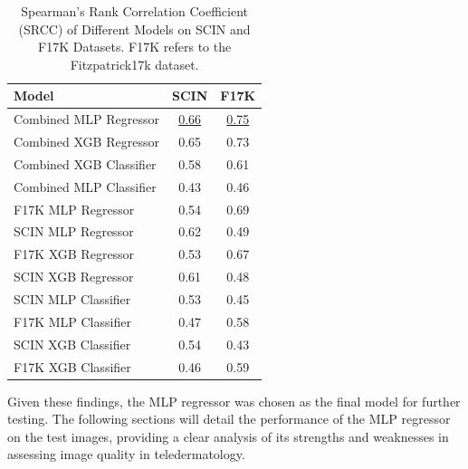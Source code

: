 \begin{table}[h]
    \centering
    \begin{tabular}{|l|c|c|}
        \hline
        \textbf{Model} & \textbf{SCIN} & \textbf{F17K} \\
        \hline
        Combined MLP Regressor & \underline{0.66} & \underline{0.75} \\
        Combined XGB Regressor & 0.65 & 0.73 \\
        Combined XGB Classifier & 0.58 & 0.61 \\
        Combined MLP Classifier & 0.43 & 0.46 \\
        \hline
        F17K MLP Regressor & 0.54 & 0.69 \\
        SCIN MLP Regressor & 0.62 & 0.49 \\
        F17K XGB Regressor & 0.53 & 0.67 \\
        SCIN XGB Regressor & 0.61 & 0.48 \\
        SCIN MLP Classifier & 0.53 & 0.45 \\
        F17K MLP Classifier & 0.47 & 0.58 \\
        SCIN XGB Classifier & 0.54 & 0.43 \\
        F17K XGB Classifier & 0.46 & 0.59 \\
        \hline
    \end{tabular}
    \caption{Spearman’s Rank Correlation Coefficient (SRCC) of Different Models on SCIN and F17K Datasets. F17K refers to the Fitzpatrick17k dataset.}
    \label{table:srcc_results}
\end{table}
\noindent
Given these findings, the MLP regressor was chosen as the final model for further testing. The following sections will detail the performance of the MLP regressor on the test images, providing a clear analysis of its strengths and weaknesses in assessing image quality in teledermatology. \par

